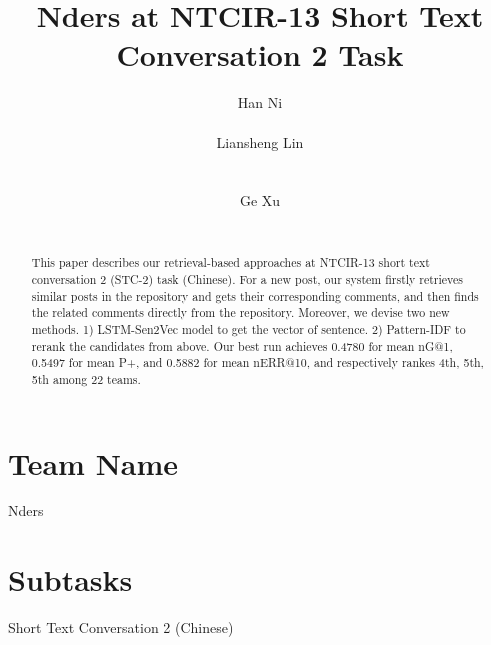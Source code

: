 \documentclass{sig-alternate}
\begin{document}
\title{Nders at NTCIR-13 Short Text Conversation 2 Task}

\author{
%
%
\alignauthor
Han Ni\\
       \\
\alignauthor
Liansheng Lin\\
       \\
       \\
\alignauthor 
Ge Xu\\
       \\
}



\maketitle

\begin{abstract}
This paper describes our retrieval-based approaches at NTCIR-13 short text conversation 2 
(STC-2) task (Chinese). For a new post, our system firstly retrieves similar posts 
in the repository and gets their corresponding comments, and then finds the 
related comments directly from the repository. Moreover, we devise two new methods. 1)  LSTM-Sen2Vec model to get the vector of sentence. 2) Pattern-IDF 
to rerank the candidates from above. Our best run achieves 0.4780 for mean nG@1, 
0.5497 for mean P+, and 0.5882 for mean nERR@10, and respectively rankes 4th, 
5th, 5th among 22 teams. 
\end{abstract}

\section*{Team Name}
Nders

\section*{Subtasks}
Short Text Conversation 2 (Chinese)
\end{document}
